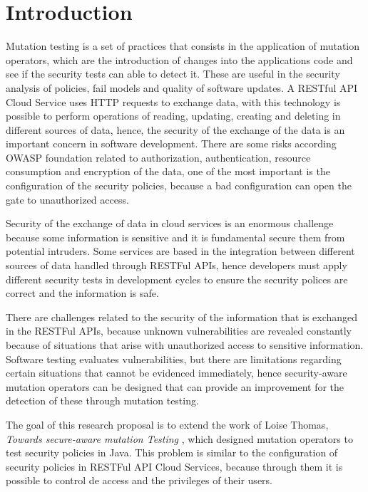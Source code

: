 \chapter*{Introduction}

Mutation testing is a set of practices that consists in the application of mutation operators, which are the introduction of changes into the applications code and see if the security tests can able to detect it. These are useful in the security analysis of policies\cite{8967426}, fail models\cite{6569774} and quality of software updates\cite{kravets2012feasibility}. A RESTful API Cloud Service uses HTTP requests to exchange data, with this technology is possible to perform operations of reading, updating, creating and deleting in different sources of data, hence, the security of the exchange of the data is an important concern in software development. There are some risks according OWASP foundation related to authorization, authentication, resource consumption and encryption of the data, one of the most important is the configuration of the security policies, because a bad configuration can open the gate to unauthorized access.

Security of the exchange of data in cloud services is an enormous challenge because some information is sensitive and it is fundamental secure them from potential intruders. Some services are based in the integration between different sources of data handled through RESTFul APIs, hence developers must apply different security tests in development cycles to ensure the security polices are correct and the information is safe.

There are challenges related to the security of the information that is exchanged in the RESTFul APIs, because unknown vulnerabilities are revealed constantly because of situations that arise with unauthorized access to sensitive information. Software testing evaluates vulnerabilities, but there are limitations regarding certain situations that cannot be evidenced immediately, hence security-aware mutation operators can be designed that can provide an improvement for the detection of these through mutation testing.

The goal of this research proposal is to extend the work of Loise Thomas, \textit{Towards secure-aware mutation Testing} \cite{Loise2017}, which designed mutation operators to test security policies in Java. This problem is similar to the configuration of security policies in RESTFul API Cloud Services, because through them it is possible to control de access and the privileges of their users.

